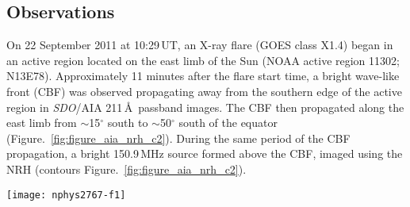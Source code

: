 \subsection{Observations}
On 22 September 2011 at 10:29\,UT, an X-ray flare (GOES class X1.4) began in an active region located on the east limb of the Sun (NOAA active region 11302; N13E78). Approximately 11 minutes after the flare start time, a bright wave-like front (CBF) was observed propagating away from the southern edge of the active region in \emph{SDO}/AIA 211\,\AA~passband images. The CBF then propagated along the east limb from $\sim$15$^{\circ}\,$\,south to $\sim$50$^{\circ}\,$\,south of the equator (Figure.~\ref{fig:figure_aia_nrh_c2}). During the same period of the CBF propagation, a bright 150.9\,MHz source formed above the CBF, imaged using the NRH (contours Figure.~\ref{fig:figure_aia_nrh_c2}). 
%
%
\begin{sidewaysfigure}
    \centering
	\texttt{[image: nphys2767-f1]}
	\caption[Propagation of CBF and radio burst]{{\bf a-f} show that the 150\,MHz source follows closely the coronal bright front (CBF) as it propagates around the east limb, indicating they belong to a common structure. The intensity of the radio source is indicated by the colour bar on the right. {\bf c} reveals the role of the CME in the event, as observed by the LASCO C2 coronagraph. The combination of the white-light coronagraph (C2) and the EUV images (AIA) reveal the full spatial extent of the CME bubble i.e., the frontal structure in white-light has clear extensions back toward the solar surface, imaged at EUV. The location of the radio source and CBF show they clearly have a relationship with the southward CME flank \citep{carley2013}. 1\,nm  = 10\,\AA.}
	\label{fig:figure_aia_nrh_c2}
\end{sidewaysfigure}
%
%
